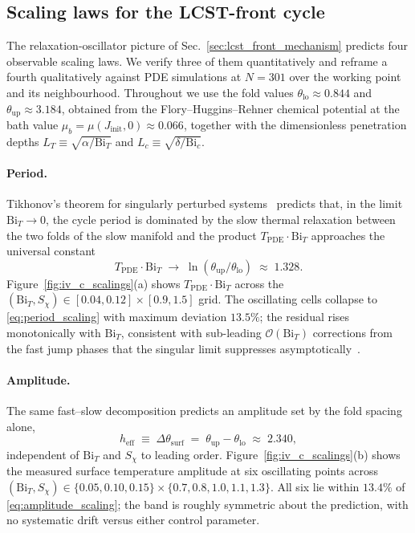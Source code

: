 \documentclass[aps,pre,reprint,superscriptaddress,longbibliography,floatfix]{revtex4-2}
\newcommand{\Bi}{\mathrm{Bi}}
\begin{document}
\FloatBarrier

\subsection{Scaling laws for the LCST-front cycle}
\label{sec:scaling_laws}

The relaxation-oscillator picture of
Sec.~\ref{sec:lcst_front_mechanism} predicts four observable scaling
laws. We verify three of them quantitatively and reframe a fourth
qualitatively against PDE simulations at $N\!=\!301$ over the
working point and its neighbourhood. Throughout we use the fold
values $\theta_\mathrm{lo}\!\approx\!0.844$ and
$\theta_\mathrm{up}\!\approx\!3.184$, obtained from the
Flory--Huggins--Rehner chemical potential at the bath value
$\mu_b\!=\!\mu(J_\mathrm{init},0)\!\approx\!0.066$, together with the
dimensionless penetration depths
$L_T\!\equiv\!\sqrt{\alpha/\Bi_T}$ and
$L_c\!\equiv\!\sqrt{\delta/\Bi_c}$.

\paragraph{Period.}
Tikhonov's theorem for singularly perturbed
systems~\cite{Tikhonov1952,Fenichel1979} predicts that, in the limit
$\Bi_T\!\to\!0$, the cycle period is dominated by the slow thermal
relaxation between the two folds of the slow manifold and the
product $T_\mathrm{PDE}\!\cdot\!\Bi_T$ approaches the universal
constant
\begin{equation}
  T_\mathrm{PDE}\cdot\Bi_T
    \;\to\; \ln(\theta_\mathrm{up}/\theta_\mathrm{lo})
    \;\approx\; 1.328.
  \label{eq:period_scaling}
\end{equation}
Figure~\ref{fig:iv_c_scalings}(a) shows
$T_\mathrm{PDE}\!\cdot\!\Bi_T$ across the
$(\Bi_T,S_\chi)\!\in\![0.04,0.12]\!\times\![0.9,1.5]$ grid. The
oscillating cells collapse to \eqref{eq:period_scaling} with
maximum deviation $13.5\%$; the residual rises monotonically with
$\Bi_T$, consistent with sub-leading $\mathcal{O}(\Bi_T)$
corrections from the fast jump phases that the singular limit
suppresses asymptotically~\cite{Kuehn2015}.

\paragraph{Amplitude.}
The same fast--slow decomposition predicts an amplitude set by the
fold spacing alone,
\begin{equation}
  h_\mathrm{eff}
    \;\equiv\; \Delta\theta_\mathrm{surf}
    \;=\; \theta_\mathrm{up}-\theta_\mathrm{lo}
    \;\approx\; 2.340,
  \label{eq:amplitude_scaling}
\end{equation}
independent of $\Bi_T$ and $S_\chi$ to leading order.
Figure~\ref{fig:iv_c_scalings}(b) shows the measured surface
temperature amplitude at six oscillating points across
$(\Bi_T,S_\chi)\!\in\!\{0.05,0.10,0.15\}\!\times\!\{0.7,0.8,1.0,1.1,1.3\}$.
All six lie within $13.4\%$ of \eqref{eq:amplitude_scaling}; the
band is roughly symmetric about the prediction, with no systematic
drift versus either control parameter.
\end{document}
